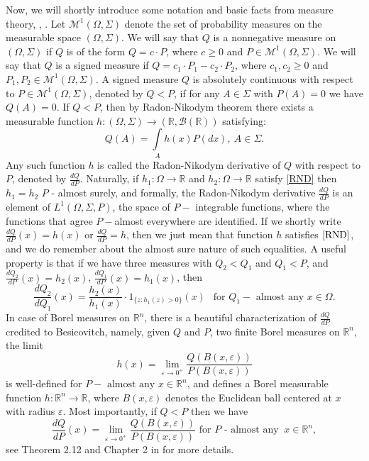 \documentclass[sn-mathphys,Numbered,11pt]{sn-jnl}%
\theoremstyle{thmstyleone}%
\newcommand{\mcl}{\mathcal}
\newcommand{\eps}{\varepsilon}
\newcommand{\R}{\mathbb{R}}
\begin{document}
Now, we will shortly introduce some notation and basic facts  from measure theory, \cite{Ma}, \cite{Rudin}. Let $\mcl{M}^1(\Omega,\Sigma)$ denote the set of probability measures on the measurable space $(\Omega,\Sigma)$. We will say that $Q$ is a nonnegative measure on $(\Omega,\Sigma)$ if $Q$ is of the form $Q=c\cdot P$, where $c\geq0$ and $P\in \mcl{M}^1(\Omega,\Sigma)$. We will say that $Q$ is a signed measure if $Q=c_1\cdot P_1 - c_2\cdot P_2$, where $c_1,c_2\geq0$ and $P_1,P_2\in \mcl{M}^1(\Omega,\Sigma)$. A signed measure $Q$ is absolutely continuous with respect to $P\in \mcl{M}^1(\Omega,\Sigma)$, denoted by $Q<P$, if for any $A\in\Sigma$ with $P(A)=0$ we have $Q(A)=0$. If $Q<P$, then by Radon-Nikodym theorem there exists  a measurable function $h \colon (\Omega,\Sigma)\to(\R,\mcl{B}(\R))$ satisfying:
\begin{equation}\label{RND}
Q(A)=\int\limits_A h(x)P(dx),\ A\in\Sigma.
\end{equation} 
 Any such function $h$ is called the Radon-Nikodym derivative of $Q$ with respect to $P$, denoted by $\frac{dQ}{dP}$. Naturally, if $h_1\colon \Omega\to\R$ and $h_2\colon \Omega\to\R$ satisfy \eqref{RND} then $h_1=h_2$
  $P$ - almost surely, and formally, the Radon-Nikodym derivative $\frac{dQ}{dP}$ is  an element of $L^1(\Omega,\Sigma,P)$, the space of $P-$ integrable functions, where the functions that agree $P-$almost everywhere are identified. If we shortly write $\frac{dQ}{dP}(x)=h(x)$ or $\frac{dQ}{dP}=h$, then we just  mean that function $h$ satisfies $\eqref{RND}$, and we do remember about the almost sure nature of such equalities. A useful property is that if we have three measures with $Q_2<Q_1$ and $Q_1<P$, and $\frac{dQ_2}{dP}(x)=h_2(x)$, $\frac{dQ_1}{dP}(x)=h_1(x)$,  then 
\begin{equation}\label{prop}
\frac{dQ_2}{dQ_1}(x)=\frac{h_2(x)}{h_1(x)}\cdot 1_{\{z\colon h_1(z)>0\}}(x) \ \ \mbox{ for } Q_1-\mbox{ almost any } x\in\Omega.
\end{equation}
 In  case of Borel measures on $\R^n$, there is a beautiful characterization of $\frac{dQ}{dP}$ credited to Besicovitch, namely, given $Q$ and $P$, two finite Borel measures on $\R^n$, the limit
$$h(x)=\lim\limits_{\eps\to0^+}\frac{Q(B(x,\eps))}{P(B(x,\eps))}$$
is well-defined  for $P-\mbox{ almost any } x\in\R^n$, and defines a Borel measurable function $h\colon\R^n\to\R$, where $B(x,\eps)$ denotes the Euclidean ball centered at $x$ with radius $\eps$. Most importantly, if $Q<P$ then we have
\begin{equation}\label{RNCH}
\frac{dQ}{dP}(x)=\lim\limits_{\eps\to0^+}\frac{Q(B(x,\eps))}{P(B(x,\eps))}\mbox{  \  \  \ \ \ for\ \  }P  \mbox{\ \ - almost any }\ x\in\R^n,
\end{equation}
 see  Theorem 2.12 and Chapter 2 in \cite{Ma} for more details.
\end{document}
